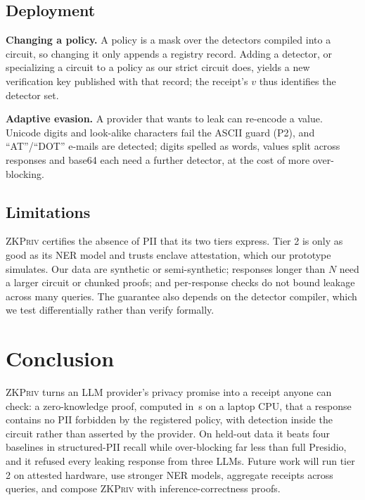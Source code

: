 \documentclass[conference]{IEEEtran}
\newcommand{\sys}{\textsc{ZKPriv}}
\begin{document}
\subsection{Deployment}

\textbf{Changing a policy.} A policy is a mask over the detectors compiled into a circuit, so changing it only appends a registry record. Adding a detector, or specializing a circuit to a policy as our strict circuit does, yields a new verification key published with that record; the receipt's $v$ thus identifies the detector set.

\textbf{Adaptive evasion.} A provider that wants to leak can re-encode a value. Unicode digits and look-alike characters fail the ASCII guard (P2), and ``AT''/``DOT'' e-mails are detected; digits spelled as words, values split across responses and base64 each need a further detector, at the cost of more over-blocking.

\subsection{Limitations}
\label{sec:limits}

\sys{} certifies the absence of PII that its two tiers express. Tier 2 is only as good as its NER model and trusts enclave attestation, which our prototype simulates. Our data are synthetic or semi-synthetic; responses longer than $N$ need a larger circuit or chunked proofs; and per-response checks do not bound leakage across many queries. The guarantee also depends on the detector compiler, which we test differentially rather than verify formally.

\section{Conclusion}

\sys{} turns an LLM provider's privacy promise into a receipt anyone can check: a zero-knowledge proof, computed in \strictProve{}\,s on a laptop CPU, that a response contains no PII forbidden by the registered policy, with detection inside the circuit rather than asserted by the provider. On held-out data it beats four baselines in structured-PII recall while over-blocking far less than full Presidio, and it refused every leaking response from three LLMs. Future work will run tier 2 on attested hardware, use stronger NER models, aggregate receipts across queries, and compose \sys{} with inference-correctness proofs.



\end{document}
